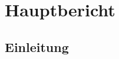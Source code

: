 \documentclass[12pt, a4paper]{report}
\begin{document}
	
	
	
	
	
	
	
		
	
	
	
	
	
	\part{Hauptbericht}
	
	\chapter{Einleitung}
	
	
	
	
	
	
\end{document}
